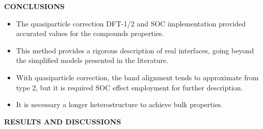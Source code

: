 \documentclass[a0,portrait]{a0poster}
\begin{document}
\begin{multicols}{3}

\hrulefill
\vspace{-0.7cm}
\begin{center} 
\Large \bf{CONCLUSIONS}
\end{center}
\vspace{-1.5cm}
\hrulefill

\begin{itemize}
\item The quasiparticle correction DFT-1/2 and SOC implementation provided accurated values for the compounds properties.
\item This method provides a rigorous description of real interfaces, going beyond the simplified models presented in the literature.
\item With quasiparticle correction, the band alignment tends to approximate from type 2, but it is required SOC effect employment for further description.
\item It is necessary a longer heterostructure to achieve bulk properties.
\end{itemize}


\end{multicols}

\vspace{1cm}

\hrulefill
\vspace{-0.7cm}
\begin{center} 
\Large \bf{RESULTS AND DISCUSSIONS}
\end{center}
\vspace{-0.8cm}
\hrulefill
\end{document}
